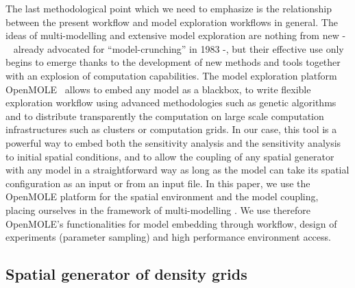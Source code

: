 \documentclass{JASSS}
\begin{document}
The last methodological point which we need to emphasize is the relationship between the present workflow and model exploration workflows in general. The ideas of multi-modelling and extensive model exploration are nothing from new - ~\cite{openshaw1983data} already advocated for ``model-crunching'' in 1983 -, but their effective use only begins to emerge thanks to the development of new methods and tools together with an explosion of computation capabilities. The model exploration platform OpenMOLE~\citep{reuillon2013openmole} allows to embed any model as a blackbox, to write flexible exploration workflow using advanced methodologies such as genetic algorithms and to distribute transparently the computation on large scale computation infrastructures such as clusters or computation grids. In our case, this tool is a powerful way to embed both the sensitivity analysis and the sensitivity analysis to initial spatial conditions, and to allow the coupling of any spatial generator with any model in a straightforward way as long as the model can take its spatial configuration as an input or from an input file. In this paper, we use the OpenMOLE platform for the spatial environment and the model coupling, placing ourselves in the framework of multi-modelling \citep{cottineau2015modular}. We use therefore OpenMOLE's functionalities for model embedding through workflow, design of experiments (parameter sampling) and high performance environment access.


\subsection{Spatial generator of density grids}
\end{document}

